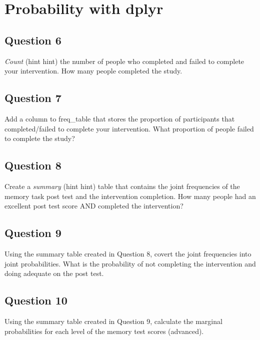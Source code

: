 \documentclass[]{book}
\theoremstyle{definition}
\theoremstyle{definition}
\theoremstyle{definition}
\theoremstyle{remark}
\begin{document}
\hypertarget{probability-with-dplyr}{%
\section{Probability with dplyr}\label{probability-with-dplyr}}

\hypertarget{question-6}{%
\subsection{Question 6}\label{question-6}}

\emph{Count} (hint hint) the number of people who completed and failed to complete your intervention. How many people completed the study.

\hypertarget{question-7}{%
\subsection{Question 7}\label{question-7}}

Add a column to freq\_table that stores the proportion of participants that completed/failed to complete your intervention. What proportion of people failed to complete the study?

\hypertarget{question-8}{%
\subsection{Question 8}\label{question-8}}

Create a \emph{summary} (hint hint) table that contains the joint frequencies of the memory task post test and the intervention completion. How many people had an excellent post test score AND completed the intervention?

\hypertarget{question-9}{%
\subsection{Question 9}\label{question-9}}

Using the summary table created in Question 8, covert the joint frequencies into joint probabilities. What is the probability of not completing the intervention and doing adequate on the post test.

\hypertarget{question-10}{%
\subsection{Question 10}\label{question-10}}

Using the summary table created in Question 9, calculate the marginal probabilities for each level of the memory test scores (advanced).
\end{document}
